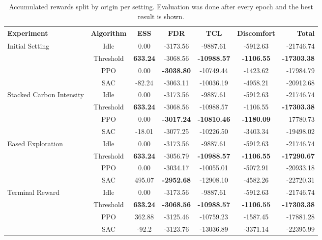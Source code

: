 \begin{table}[t]
\caption{Accumulated rewards split by origin per setting. Evaluation was done after every epoch and the best result is shown.}
\label{tab:experiments}
\vskip 0.15in
\begin{center}
\begin{small}
\begin{sc}
\begin{tabular}{lcccccr}
\toprule
Experiment & Algorithm & ESS & FDR & TCL & Discomfort & Total \\
\midrule
\multirow{4}{*}{Initial Setting} 
    & Idle      & 0.00   & -3173.56 & -9887.61  & -5912.63  & -21746.74 \\
    & Threshold & \textbf{633.24} & -3068.56 & \textbf{-10988.57} & \textbf{-1106.55}  & \textbf{-17303.38} \\
    & PPO       & 0.00   & \textbf{-3038.80} & -10749.44 & -1423.62  & -17984.79 \\
    & SAC       & -82.24 & -3063.11 & -10036.19 & -4958.21  & -20912.68 \\
\midrule
\multirow{4}{*}{Stacked Carbon Intensity}
    & Idle      & 0.00   & -3173.56 & -9887.61  & -5912.63  & -21746.74 \\
    & Threshold & \textbf{633.24} & -3068.56 & -10988.57 & -1106.55  &  \textbf{-17303.38} \\
    & PPO       & 0.00   & \textbf{-3017.24} & \textbf{-10810.46} &  \textbf{-1180.09}  & -17780.73 \\
    & SAC       & -18.01 & -3077.25 & -10226.50 & -3403.34  & -19498.02 \\
\midrule
\multirow{4}{*}{Eased Exploration}
    & Idle      & 0.00   & -3173.56 & -9887.61  & -5912.63 & -21746.74 \\
    & Threshold & \textbf{633.24} & -3056.79 & \textbf{-10988.57} & \textbf{-1106.55} & \textbf{-17290.67} \\
    & PPO       & 0.00   & -3034.17 & -10055.01  & -5072.91 & -20933.18  \\
    & SAC       & 495.07 & \textbf{-2952.68} & -12908.10 & -4582.26 & -22720.31  \\
\midrule
\multirow{4}{*}{Terminal Reward} 
    & Idle      & 0.00   & -3173.56 & -9887.61  & -5912.63  & -21746.74 \\
    & Threshold & \textbf{633.24} & \textbf{-3068.56} & \textbf{-10988.57} & \textbf{-1106.55}  & \textbf{-17303.38} \\
    & PPO       & 362.88 & -3125.46 & -10759.23 & -1587.45  & -17881.28 \\
    & SAC       & -92.2  & -3123.76 & -13036.89 & -3371.14  & -22395.99 \\
\bottomrule
\end{tabular}
\end{sc}
\end{small}
\end{center}
\vskip -0.1in
\end{table}

